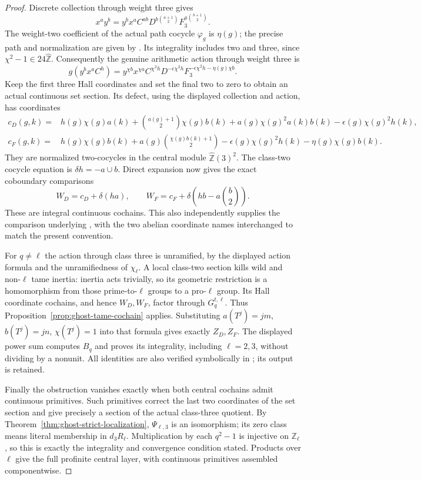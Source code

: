 \begin{proof}
Discrete collection through weight three gives
\[
 x^a y^b=y^b x^a C^{ab}
                  D^{b\binom{a+1}{2}}F_3^{a\binom{b+1}{2}}.
\]
The weight-two coefficient of the actual path cocycle
\(\varphi_g\) is \(\eta(g)\); the precise path and
normalization are given by
\cite[(12.12), (12.19), (12.35)]{GhostWickelgren2012}.
Its integrality includes two and three, since
\(\chi^2-1\in24\widehat{\mathbb Z}\).
Consequently the genuine arithmetic action through
weight three is
\[
 g(y^b x^a C^h)=
 y^{\chi b}x^{\chi a}C^{\chi^2h}
 D^{-\epsilon\chi^2h}
 F_3^{-\epsilon\chi^2h-\eta(g)\chi b}.
\]
Keep the first three Hall coordinates and set the final
two to zero to obtain an actual continuous set section.
Its defect, using the displayed collection and action,
has coordinates
\[
 \begin{split}
 c_D(g,k)={}&h(g)\chi(g)a(k)
   +\binom{a(g)+1}{2}\chi(g)b(k)
   +a(g)\chi(g)^2a(k)b(k)-\epsilon(g)\chi(g)^2h(k),\\
 c_F(g,k)={}&h(g)\chi(g)b(k)
   +a(g)\binom{\chi(g)b(k)+1}{2}
   -\epsilon(g)\chi(g)^2h(k)-\eta(g)\chi(g)b(k).
 \end{split}
\]
They are normalized two-cocycles in the central module
\(\widehat{\mathbb Z}(3)^2\). The class-two cocycle
equation is \(\delta h=-a\cup b\). Direct expansion
now gives the exact coboundary comparisons
\[
 W_D=c_D+\delta(ha),\qquad
 W_F=c_F+\delta\left(hb-a\binom b2\right).
\]
These are integral continuous cochains. This also
independently supplies the comparison underlying
\cite[Propositions 13 and 17]{GhostWickelgren2012},
with the two abelian coordinate names interchanged to
match the present convention.

For \(q\ne\ell\) the action through class three is
unramified, by the displayed action formula and the
unramifiedness of \(\chi_\ell\). A local class-two
section kills wild and non-\(\ell\) tame inertia:
inertia acts trivially, so its geometric restriction is
a homomorphism from those prime-to-\(\ell\) groups to
a pro-\(\ell\) group. Its Hall coordinate cochains,
and hence \(W_D,W_F\), factor through \(G_q^{t,\ell}\).
Thus Proposition~\ref{prop:ghost-tame-cochain} applies.
Substituting \(a(T^j)=jm\), \(b(T^j)=jn\),
\(\chi(T^j)=1\) into that formula gives exactly
\(Z_D,Z_F\). The displayed power sum computes \(B_q\)
and proves its integrality, including \(\ell=2,3\),
without dividing by a nonunit. All identities are
also verified symbolically in
; its output is retained.

Finally the obstruction vanishes exactly when both
central cochains admit continuous primitives. Such
primitives correct the last two coordinates of the
set section and give precisely a section of the actual
class-three quotient. By
Theorem~\ref{thm:ghost-strict-localization},
\(\Psi_{\ell,3}\) is an isomorphism; its zero class
means literal membership in \(d_3R_\ell\). Multiplication
by each \(q^2-1\) is injective on \(\mathbb Z_\ell\),
so this is exactly the integrality and convergence
condition stated. Products over \(\ell\) give the
full profinite central layer, with continuous primitives
assembled componentwise.
\end{proof}

